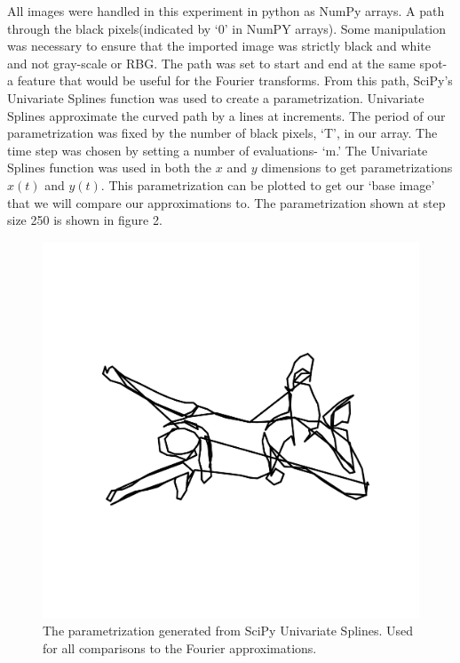 \documentclass[psamsfonts]{amsart}
\theoremstyle{definition}
\theoremstyle{remark}
\numberwithin{equation}{section}
\begin{document}
 All images were handled in this experiment in python as NumPy arrays. A path through the black pixels(indicated by `0' in NumPY arrays). Some manipulation was necessary to ensure that the imported image was strictly black and white and not gray-scale or RBG. The path was set to start and end at the same spot- a feature that would be useful for the Fourier transforms. From this path, SciPy's Univariate Splines function was used to create a parametrization. Univariate Splines approximate the curved path by a lines at increments. The period of our parametrization was fixed by the number of black pixels, `T', in our array. The time step was chosen by setting a number of evaluations- `m.' The Univariate Splines function was used in both the $x$ and $y$ dimensions to get parametrizations $x(t)$ and $y(t)$. 
This parametrization can be plotted to get our `base image' that we will compare our approximations to.  The parametrization shown at step size 250 is shown in figure 2. 

\begin{figure}[h!]
	\centering
	\includegraphics[scale=.2]{girl_250_param.png}
	\caption{The parametrization generated from SciPy Univariate Splines. Used for all comparisons to the Fourier approximations.}
\end{figure}
\end{document}
